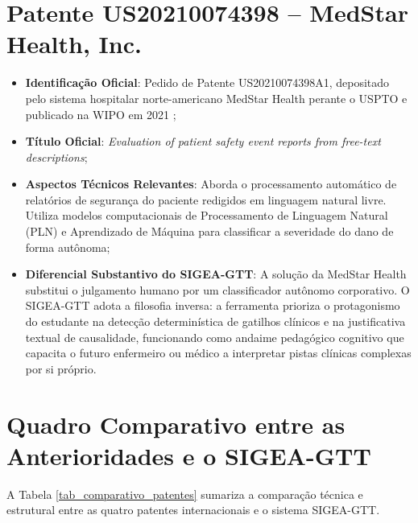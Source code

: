 \section{Patente US20210074398 -- MedStar Health, Inc.}
\label{sec_patente_medstar}

\begin{itemize}
    \item \textbf{Identificação Oficial}: Pedido de Patente US20210074398A1, depositado pelo sistema hospitalar norte-americano MedStar Health perante o USPTO e publicado na WIPO em 2021 \cite{patente_us20210074398};
    \item \textbf{Título Oficial}: \textit{Evaluation of patient safety event reports from free-text descriptions};
    \item \textbf{Aspectos Técnicos Relevantes}: Aborda o processamento automático de relatórios de segurança do paciente redigidos em linguagem natural livre. Utiliza modelos computacionais de Processamento de Linguagem Natural (PLN) e Aprendizado de Máquina para classificar a severidade do dano de forma autônoma;
    \item \textbf{Diferencial Substantivo do SIGEA-GTT}: A solução da MedStar Health substitui o julgamento humano por um classificador autônomo corporativo. O SIGEA-GTT adota a filosofia inversa: a ferramenta prioriza o protagonismo do estudante na detecção determinística de gatilhos clínicos e na justificativa textual de causalidade, funcionando como andaime pedagógico cognitivo que capacita o futuro enfermeiro ou médico a interpretar pistas clínicas complexas por si próprio.
\end{itemize}

\section{Quadro Comparativo entre as Anterioridades e o SIGEA-GTT}
\label{sec_quadro_comparativo_patentes}

A Tabela \ref{tab_comparativo_patentes} sumariza a comparação técnica e estrutural entre as quatro patentes internacionais e o sistema SIGEA-GTT.

